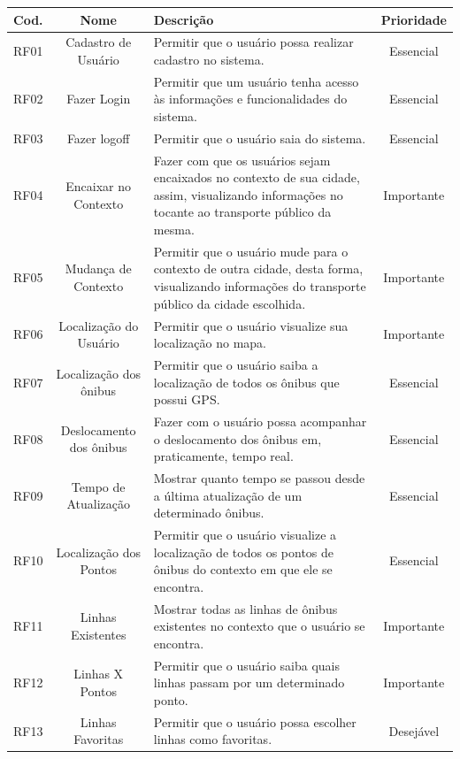 \begin{center}
\begin{longtable}{c|c|p{8cm}|c}
\hline
\textbf{Cod.} & \textbf{Nome} & \textbf{Descrição} & \textbf{Prioridade} \\
\hline
RF01  & Cadastro de Usuário & Permitir que o usuário possa realizar cadastro no sistema. & Essencial \\
\hline
    RF02  & Fazer Login & Permitir que um usuário tenha acesso às informações e funcionalidades do sistema. & Essencial \\
\hline
    RF03  & Fazer logoff & Permitir que o usuário saia do sistema. & Essencial \\
\hline
    RF04  & Encaixar no Contexto & Fazer com que os usuários sejam encaixados no contexto de sua cidade, assim, visualizando informações no tocante ao transporte público da mesma. & Importante \\
\hline
    RF05  & Mudança de Contexto & Permitir que o usuário mude para o contexto de outra cidade, desta forma, visualizando informações do transporte público da cidade escolhida. & Importante \\
\hline
    RF06  & Localização do Usuário & Permitir que o usuário visualize sua localização no mapa. & Importante \\
\hline
    RF07  & Localização dos ônibus & Permitir que o usuário saiba a localização de todos os ônibus que possui GPS. & Essencial \\
\hline
    RF08  & Deslocamento dos ônibus & Fazer com o usuário possa acompanhar o deslocamento dos ônibus em, praticamente, tempo real. & Essencial \\
\hline
    RF09  & Tempo de Atualização & Mostrar quanto tempo se passou desde a última atualização de um determinado ônibus. & Essencial \\
\hline
    RF10  & Localização dos Pontos & Permitir que o usuário visualize a localização de todos os pontos de ônibus do contexto em que ele se encontra. & Essencial \\
\hline
    RF11  & Linhas Existentes & Mostrar todas as linhas de ônibus existentes no contexto que o usuário se encontra. & Importante \\
\hline
    RF12  & Linhas X Pontos & Permitir que o usuário saiba quais linhas passam por um determinado ponto. & Importante \\
\hline
    RF13  & Linhas Favoritas & Permitir que o usuário possa escolher linhas como favoritas. & Desejável \\

\end{longtable}
\end{center}
